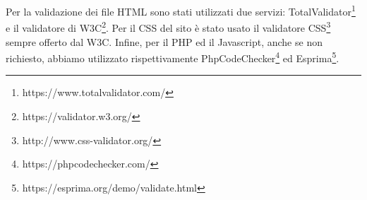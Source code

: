 Per la validazione dei file HTML sono stati utilizzati due servizi: TotalValidator\footnote{https://www.totalvalidator.com/} e il validatore di W3C\footnote{https://validator.w3.org/}.
Per il CSS del sito è stato usato il validatore CSS\footnote{http://www.css-validator.org/} sempre offerto dal W3C.
Infine, per il PHP ed il Javascript, anche se non richiesto, abbiamo utilizzato rispettivamente PhpCodeChecker\footnote{https://phpcodechecker.com/} ed Esprima\footnote{https://esprima.org/demo/validate.html}.